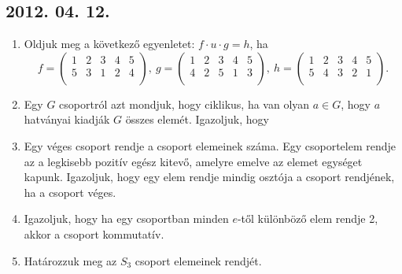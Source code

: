 \subsection*{2012. 04. 12.}
\begin{enumerate}
\item Oldjuk meg a következő egyenletet: $f\cdot u\cdot g=h$, ha 
\[f=\left(\begin{matrix}
1&2&3&4&5\\
5&3&1&2&4\\
\end{matrix}\right),~
g=\left(\begin{matrix}
1&2&3&4&5\\
4&2&5&1&3\\
\end{matrix}\right),~
h=\left(\begin{matrix}
1&2&3&4&5\\
5&4&3&2&1\\
\end{matrix}\right).\]
\item Egy $G$ csoportról azt mondjuk, hogy ciklikus, ha van olyan $a\in G$, hogy $a$ hatványai kiadják $G$ összes elemét. Igazoljuk, hogy
\item Egy véges csoport rendje a csoport elemeinek száma. Egy csoportelem rendje az a legkisebb pozitív egész kitevő, amelyre emelve az elemet egységet kapunk. Igazoljuk, hogy egy elem rendje mindig osztója a csoport rendjének, ha a csoport véges.
\item Igazoljuk, hogy ha egy csoportban minden $e$-től különböző elem rendje 2, akkor a csoport kommutatív.
\item Határozzuk meg az $S_3$ csoport elemeinek rendjét.
\end{enumerate}

